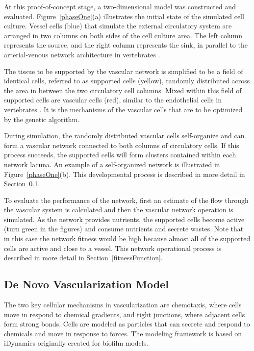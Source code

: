 \label{vascularModel}



At this proof-of-concept stage, a two-dimensional model was constructed and evaluated. Figure~\ref{phaseOne}(a) illustrates the initial state of the simulated cell culture. Vessel cells (blue) that simulate the external circulatory system are arranged in two columns on both sides of the cell culture area. The left column represents the source, and the right column represents the sink, in parallel to the arterial-venous network architecture in vertebrates \cite{delindavis:arterialvenoussystems}.

The tissue to be supported by the vascular network is simplified to be a field of identical cells, referred to as supported cells (yellow), randomly distributed across the area in between the two circulatory cell columns. Mixed within this field of supported cells are vascular cells (red), similar  to the endothelial cells in vertebrates \cite{delindavis:Merks2008ContactInhibited}. It is the mechanisms of the vascular cells that are to be optimized by the genetic algorithm.

During simulation, the randomly distributed vascular cells self-organize and can form a vascular network connected to both columns of circulatory cells. If this process succeeds, the supported cells will form clusters contained within each network lacuna. An example of a self-organized network is illustrated in Figure~\ref{phaseOne}(b). This developmental process is described in more detail in Section~\ref{vesselDevelopment}.

To evaluate the performance of the network, first an estimate of the flow through the vascular system is calculated and then the vascular network operation is simulated. As the network provides nutrients, the supported cells become active (turn green in the figures) and consume nutrients and secrete wastes. Note that in this case the network fitness would be high because almost all of the supported cells are active and close to a vessel. This network operational process is described in more detail in Section~\ref{fitnessFunction}.

\subsection{De Novo Vascularization Model}
\label{vesselDevelopment}

The two key cellular mechanisms in vascularization are chemotaxis, where cells move in respond to chemical gradients, and tight junctions, where adjacent cells form strong bonds.  Cells are modeled as particles that can secrete and respond to chemicals and move in response to forces. The modeling framework is based on iDynamics \cite{Lardon2011IDynoMiCS} originally created for biofilm models.

